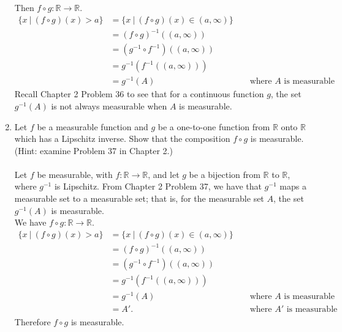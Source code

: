 \begin{enumerate}
        Then $f\circ g:\mathbb{R}\to\mathbb{R}$.
        \begin{align*}
            \{x\ |\ (f\circ g )(x)>a\}&=\{x\ |\ (f\circ g )(x)\in(a,\infty)\}\\
            &=(f\circ g )^{-1}((a,\infty))\\
            &=(g^{-1}\circ f^{-1})((a,\infty))\\
            &=g^{-1}(f^{-1}((a,\infty)))\\
            &=g^{-1}(A)&&\text{ where }A\text{ is measurable}
        \end{align*}
        Recall Chapter 2 Problem 36 to see that for a continuous function $g$, the set $g^{-1}(A)$ is not always measurable when $A$ is measurable.
    \item Let $f$ be a measurable function and $g$ be a one-to-one function from $\mathbb{R}$ onto $\mathbb{R}$ which has a Lipschitz inverse. Show that the composition $f\circ g$ is measurable. (Hint: examine Problem 37 in Chapter 2.)\\
    \\Let $f$ be measurable, with $f:\mathbb{R}\to\mathbb{R}$, and let $g$ be a bijection from $\mathbb{R}$ to $\mathbb{R}$, where $g^{-1}$ is Lipschitz.
    From Chapter 2 Problem 37, we have that $g^{-1}$ maps a measurable set to a measurable set; that is, for the measurable set $A$, the set $g^{-1}(A)$ is measurable.
    \\We have $f\circ g:\mathbb{R}\to\mathbb{R}$.
    \begin{align*}
        \{x\ |\ (f\circ g )(x)>a\}&=\{x\ |\ (f\circ g )(x)\in(a,\infty)\}\\
        &=(f\circ g )^{-1}((a,\infty))\\
        &=(g^{-1}\circ f^{-1})((a,\infty))\\
        &=g^{-1}(f^{-1}((a,\infty)))\\
        &=g^{-1}(A)&&\text{ where }A\text{ is measurable}\\
        &=A'.&&\text{ where }A'\text{ is measurable (Chapter 2 Problem 37)}
    \end{align*}
    Therefore $f\circ g$ is measurable.
\end{enumerate}

